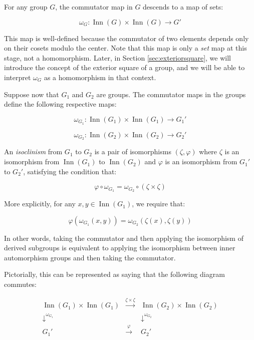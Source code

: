 \documentclass{ucetd}
\begin{document}
For any group $G$, the commutator map in $G$ descends to a map of sets:

$$\omega_G: \operatorname{Inn}(G) \times \operatorname{Inn}(G) \to G'$$

This map is well-defined because the commutator of two elements
depends only on their cosets modulo the center. Note that this map is
only a {\em set} map at this stage, not a homomorphism. Later, in
Section \ref{sec:exteriorsquare}, we will introduce the concept of the
exterior square of a group, and we will be able to interpret
$\omega_G$ as a homomorphism in that context.

Suppose now that $G_1$ and $G_2$ are groups. The commutator maps in
the groups define the following respective maps:

$$\omega_{G_1}: \operatorname{Inn}(G_1) \times \operatorname{Inn}(G_1) \to G_1'$$

$$\omega_{G_2}: \operatorname{Inn}(G_2) \times \operatorname{Inn}(G_2) \to G_2'$$

An {\em isoclinism} from $G_1$ to $G_2$ is a pair of isomorphisms
$(\zeta,\varphi)$ where $\zeta$ is an isomorphism from
$\operatorname{Inn}(G_1)$ to $\operatorname{Inn}(G_2)$ and $\varphi$ is an
isomorphism from $G_1'$ to $G_2'$, satisfying the condition that:

\begin{equation}\label{eq:homoclinism-point-free}
  \varphi \circ \omega_{G_1} = \omega_{G_2} \circ (\zeta \times \zeta)
\end{equation}

More explicitly, for any $x,y \in \operatorname{Inn}(G_1)$, we require that:

\begin{equation}\label{eq:homoclinism-pointed}
  \varphi(\omega_{G_1}(x,y)) = \omega_{G_2}(\zeta(x),\zeta(y))
\end{equation}

In other words, taking the commutator and then applying the
isomorphism of derived subgroups is equivalent to applying the
isomorphism between inner automorphism groups and then taking the
commutator.

Pictorially, this can be represented as saying that the following
diagram commutes:

$$\begin{array}{ccc}
  \operatorname{Inn}(G_1) \times \operatorname{Inn}(G_1) & \stackrel{\zeta \times \zeta}{\to} & \operatorname{Inn}(G_2) \times \operatorname{Inn}(G_2) \\
  \downarrow^{\omega_{G_1}}  & & \downarrow^{\omega_{G_2}}\\
  G_1' & \stackrel{\varphi}{\to} & G_2'\\
\end{array}$$
\end{document}
